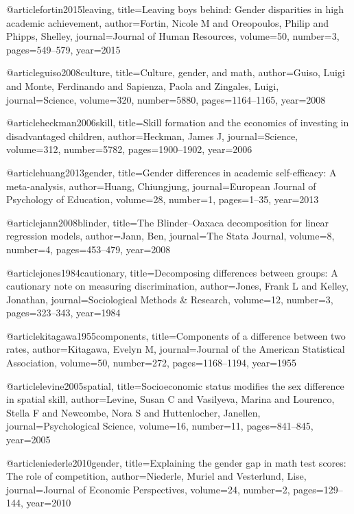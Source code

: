 @article{fortin2015leaving,
  title={Leaving boys behind: Gender disparities in high academic achievement},
  author={Fortin, Nicole M and Oreopoulos, Philip and Phipps, Shelley},
  journal={Journal of Human Resources},
  volume={50},
  number={3},
  pages={549--579},
  year={2015}
}

@article{guiso2008culture,
  title={Culture, gender, and math},
  author={Guiso, Luigi and Monte, Ferdinando and Sapienza, Paola and Zingales, Luigi},
  journal={Science},
  volume={320},
  number={5880},
  pages={1164--1165},
  year={2008}
}

@article{heckman2006skill,
  title={Skill formation and the economics of investing in disadvantaged children},
  author={Heckman, James J},
  journal={Science},
  volume={312},
  number={5782},
  pages={1900--1902},
  year={2006}
}

@article{huang2013gender,
  title={Gender differences in academic self-efficacy: A meta-analysis},
  author={Huang, Chiungjung},
  journal={European Journal of Psychology of Education},
  volume={28},
  number={1},
  pages={1--35},
  year={2013}
}

@article{jann2008blinder,
  title={The Blinder--Oaxaca decomposition for linear regression models},
  author={Jann, Ben},
  journal={The Stata Journal},
  volume={8},
  number={4},
  pages={453--479},
  year={2008}
}

@article{jones1984cautionary,
  title={Decomposing differences between groups: A cautionary note on measuring discrimination},
  author={Jones, Frank L and Kelley, Jonathan},
  journal={Sociological Methods \& Research},
  volume={12},
  number={3},
  pages={323--343},
  year={1984}
}

@article{kitagawa1955components,
  title={Components of a difference between two rates},
  author={Kitagawa, Evelyn M},
  journal={Journal of the American Statistical Association},
  volume={50},
  number={272},
  pages={1168--1194},
  year={1955}
}

@article{levine2005spatial,
  title={Socioeconomic status modifies the sex difference in spatial skill},
  author={Levine, Susan C and Vasilyeva, Marina and Lourenco, Stella F and Newcombe, Nora S and Huttenlocher, Janellen},
  journal={Psychological Science},
  volume={16},
  number={11},
  pages={841--845},
  year={2005}
}

@article{niederle2010gender,
  title={Explaining the gender gap in math test scores: The role of competition},
  author={Niederle, Muriel and Vesterlund, Lise},
  journal={Journal of Economic Perspectives},
  volume={24},
  number={2},
  pages={129--144},
  year={2010}
}

